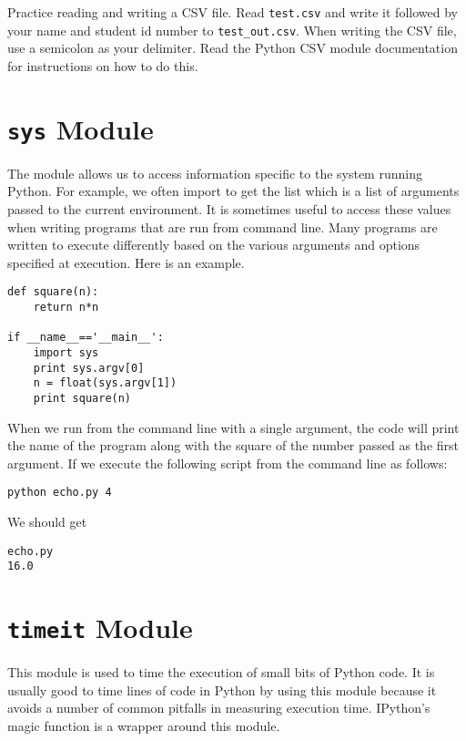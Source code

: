 \begin{problem}
Practice reading and writing a CSV file.
Read \texttt{test.csv} and write it followed by your name and student id number to \texttt{test\_out.csv}.
When writing the CSV file, use a semicolon as your delimiter.
Read the Python CSV module documentation for instructions on how to do this.
\end{problem}

\section*{\texttt{sys} Module}
The  module allows us to access information specific to the system running Python.
For example, we often import  to get the list  which is a list of arguments passed to the current environment.
It is sometimes useful to access these values when writing programs that are run from command line.
Many programs are written to execute differently based on the various arguments and options specified at execution.
Here is an example.
\begin{lstlisting}[title = echo.py]
def square(n):
    return n*n
	
if __name__=='__main__':
    import sys
    print sys.argv[0]
    n = float(sys.argv[1])
    print square(n)
\end{lstlisting}
When we run from the command line with a single argument, the code will print the name of the program along with the square of the number passed as the first argument.
If we execute the following script from the command line as follows:
\begin{verbatim}
python echo.py 4
\end{verbatim}
We should get
\begin{verbatim}
echo.py
16.0
\end{verbatim}

\section*{\texttt{timeit} Module}
This module is used to time the execution of small bits of Python code.
It is usually good to time lines of code in Python by using this module because it avoids a number of common pitfalls in measuring execution time.
IPython's  magic function is a wrapper around this module.

